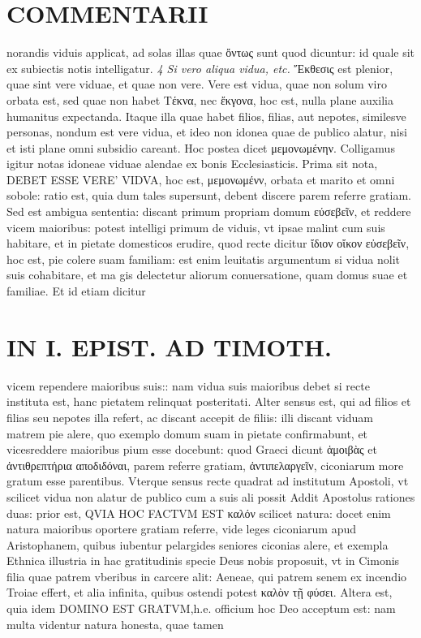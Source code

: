 \documentclass{article}
\begin{document}
\begin{pages}
\section*{COMMENTARII }
\marginpar{[ p.122 ]}\pstart norandis viduis applicat, ad solas illas quae ὄντως sunt quod dicuntur: id quale sit ex subiectis notis intelligatur.  \pend
\textit{4 Si vero aliqua vidua, etc. }\pstart Ἔκθεσις est plenior, quae sint vere viduae, et quae non vere. Vere est vidua, quae non solum viro orbata est, sed quae non habet Τέκνα, nec ἔκγονα, hoc est, nulla plane auxilia humanitus expectanda.  \pend\pstart Itaque illa quae habet filios, filias, aut nepotes, similesve personas, nondum est vere vidua, et ideo non idonea quae de publico alatur, nisi et isti plane omni subsidio careant. Hoc postea dicet μεμονωμένην. Colligamus igitur notas idoneae viduae alendae ex bonis Ecclesiasticis. Prima sit nota, DEBET ESSE VERE' VIDVA, hoc est, μεμονωμένν, orbata et marito et omni sobole: ratio est, quia dum tales supersunt, debent discere parem referre gratiam. Sed est ambigua sententia: discant primum propriam domum εύσεβεῖν, et reddere vicem maioribus: potest intelligi primum de viduis, vt ipsae malint cum suis habitare, et in pietate domesticos erudire, quod recte dicitur ἴδιον οἴκον εὐσεβεῖν, hoc est, pie colere suam familiam: est enim leuitatis argumentum si vidua nolit suis cohabitare, et ma gis delectetur aliorum conuersatione, quam domus suae et familiae. Et id etiam dicitur  \pend
\section*{IN I. EPIST. AD TIMOTH. }
\marginpar{[ p.123 ]}\pstart vicem rependere maioribus suis:: nam vidua suis maioribus debet si recte instituta est, hanc pietatem relinquat posteritati. Alter sensus est, qui ad filios et filias seu nepotes illa refert, ac discant accepit de filiis: illi discant viduam matrem pie alere, quo exemplo domum suam in pietate confirmabunt, et vicesreddere maioribus pium esse docebunt: quod Graeci dicunt ἁμοιβὰς et ἀντιθρεπτήρια αποδιδόναι, parem referre gratiam, ἀντιπελαργεῖν, ciconiarum more gratum esse parentibus. Vterque sensus recte quadrat ad institutum Apostoli, vt scilicet vidua non alatur de publico cum a suis ali possit  \pend\pstart Addit Apostolus rationes duas: prior est, QVIA HOC FACTVM EST καλόν scilicet natura: docet enim natura maioribus oportere gratiam referre, vide leges ciconiarum apud Aristophanem, quibus iubentur pelargides seniores ciconias alere, et exempla Ethnica illustria in hac gratitudinis specie Deus nobis proposuit, vt in Cimonis filia quae patrem vberibus in carcere alit: Aeneae, qui patrem senem ex incendio Troiae effert, et alia infinita, quibus ostendi potest καλὸν τῇ φύσει.  \pend\pstart Altera est, quia idem DOMINO EST GRATVM,h.e. officium hoc Deo acceptum est: nam multa videntur natura honesta, quae tamen  \pend

\end{pages}
\end{document}
